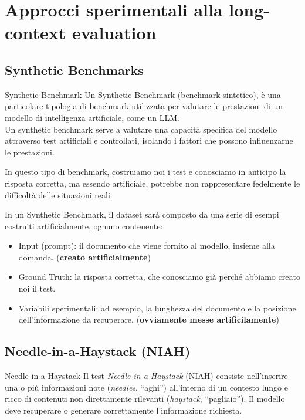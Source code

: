 \newpage

\section{Approcci sperimentali alla long-context evaluation}

\subsection{Synthetic Benchmarks}

\begin{definition}{Synthetic Benchmark}
Un Synthetic Benchmark (benchmark sintetico), è una particolare tipologia di benchmark utilizzata per valutare le prestazioni di un modello di intelligenza artificiale, come un LLM.
\\
Un synthetic benchmark serve a valutare una capacità specifica del modello attraverso test artificiali e controllati, isolando i fattori che possono influenzarne le prestazioni.

In questo tipo di benchmark, costruiamo noi i test e conosciamo in anticipo la risposta corretta, ma essendo artificiale, potrebbe non rappresentare fedelmente le difficoltà delle situazioni reali.
\end{definition}
In un Synthetic Benchmark, il dataset sarà composto da una serie di esempi costruiti artificialmente, ognuno contenente:
\begin{itemize}
    \item Input (prompt): il documento che viene fornito al modello, insieme alla domanda. (\textbf{creato artificialmente})
    \item Ground Truth: la risposta corretta, che conosciamo già perché abbiamo creato noi il test.
    \item Variabili sperimentali: ad esempio, la lunghezza del documento e la posizione dell'informazione da recuperare. (\textbf{ovviamente messe artificilamente})
\end{itemize}

\subsection{Needle-in-a-Haystack (NIAH)}

\begin{definition}{Needle-in-a-Haystack}
Il test \emph{Needle-in-a-Haystack} (NIAH) consiste nell'inserire una o più informazioni note (\emph{needles}, ``aghi'') all'interno di un contesto lungo e ricco di contenuti non direttamente rilevanti (\emph{haystack}, ``pagliaio''). Il modello deve recuperare o generare correttamente l'informazione richiesta.
\end{definition}

